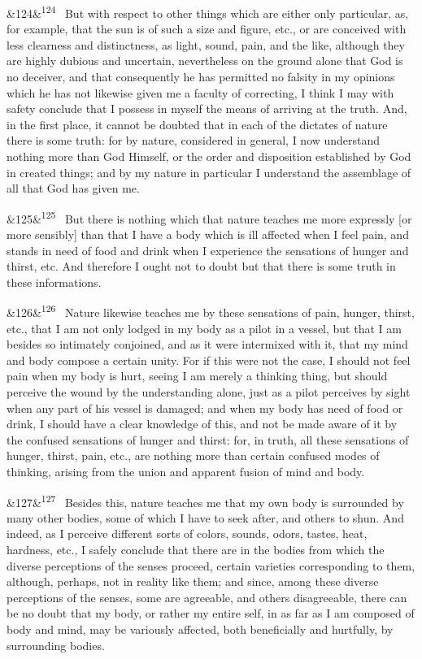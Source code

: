 \documentclass[12pt]{article}
\newcommand{\para}[1][]{\par\noindent\ifx&#1&\else\textsuperscript{\footnotesize #1}~\fi}
\begin{document}
\para[124] But with respect to other things which are either only particular, as, for example, that the sun is of such a size and figure, etc., or are conceived with less clearness and distinctness, as light, sound, pain, and the like, although they are highly dubious and uncertain, nevertheless on the ground alone that God is no deceiver, and that consequently he has permitted no falsity in my opinions which he has not likewise given me a faculty of correcting, I think I may with safety conclude that I possess in myself the means of arriving at the truth. And, in the first place, it cannot be doubted that in each of the dictates of nature there is some truth: for by nature, considered in general, I now understand nothing more than God Himself, or the order and disposition established by God in created things; and by my nature in particular I understand the assemblage of all that God has given me.

\para[125] But there is nothing which that nature teaches me more expressly [or more sensibly] than that I have a body which is ill affected when I feel pain, and stands in need of food and drink when I experience the sensations of hunger and thirst, etc. And therefore I ought not to doubt but that there is some truth in these informations.

\para[126] Nature likewise teaches me by these sensations of pain, hunger, thirst, etc., that I am not only lodged in my body as a pilot in a vessel, but that I am besides so intimately conjoined, and as it were intermixed with it, that my mind and body compose a certain unity. For if this were not the case, I should not feel pain when my body is hurt, seeing I am merely a thinking thing, but should perceive the wound by the understanding alone, just as a pilot perceives by sight when any part of his vessel is damaged; and when my body has need of food or drink, I should have a clear knowledge of this, and not be made aware of it by the confused sensations of hunger and thirst: for, in truth, all these sensations of hunger, thirst, pain, etc., are nothing more than certain confused modes of thinking, arising from the union and apparent fusion of mind and body.

\para[127] Besides this, nature teaches me that my own body is surrounded by many other bodies, some of which I have to seek after, and others to shun. And indeed, as I perceive different sorts of colors, sounds, odors, tastes, heat, hardness, etc., I safely conclude that there are in the bodies from which the diverse perceptions of the senses proceed, certain varieties corresponding to them, although, perhaps, not in reality like them; and since, among these diverse perceptions of the senses, some are agreeable, and others disagreeable, there can be no doubt that my body, or rather my entire self, in as far as I am composed of body and mind, may be variously affected, both beneficially and hurtfully, by surrounding bodies.
\end{document}
